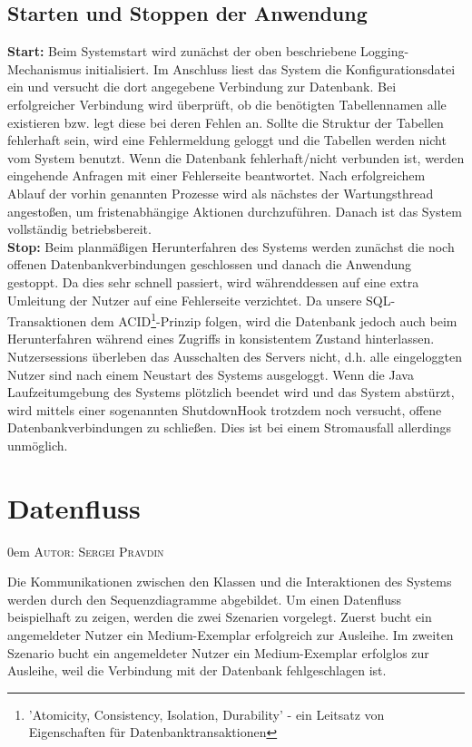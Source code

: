 \documentclass{article}
\makeatletter
\newcommand{\sectionauthor}[1]{
	{\parindent 0em \large \scshape Autor: #1 \par \nobreak \vspace*{1em}}
	\@afterheading
}
\makeatother
\begin{document}
\subsection{Starten und Stoppen der Anwendung}
\noindent \textbf{Start:} Beim Systemstart wird zunächst der oben beschriebene Logging-Mechanismus initialisiert. Im Anschluss liest das System die Konfigurationsdatei ein und versucht die dort angegebene Verbindung zur Datenbank. Bei erfolgreicher Verbindung wird überprüft, ob die benötigten Tabellennamen alle existieren bzw. legt diese bei deren Fehlen an. Sollte die Struktur der Tabellen fehlerhaft sein, wird eine Fehlermeldung geloggt und die Tabellen werden nicht vom System benutzt. Wenn die Datenbank fehlerhaft/nicht verbunden ist, werden eingehende Anfragen mit einer Fehlerseite beantwortet. Nach erfolgreichem Ablauf der vorhin genannten Prozesse wird als nächstes der Wartungsthread angestoßen, um fristenabhängige Aktionen durchzuführen. Danach ist das System vollständig betriebsbereit.\\
\textbf{Stop:} 
Beim planmäßigen Herunterfahren des Systems werden zunächst die noch offenen Datenbankverbindungen geschlossen und danach die Anwendung gestoppt. Da dies sehr schnell passiert, wird währenddessen auf eine extra Umleitung der Nutzer auf eine Fehlerseite verzichtet. Da unsere SQL-Transaktionen dem ACID\footnote{'Atomicity, Consistency, Isolation, Durability' - ein Leitsatz von Eigenschaften für Datenbanktransaktionen}-Prinzip folgen, wird die Datenbank jedoch auch beim Herunterfahren während eines Zugriffs in konsistentem Zustand hinterlassen. Nutzersessions überleben das Ausschalten des Servers nicht, d.h. alle eingeloggten Nutzer sind nach einem Neustart des Systems ausgeloggt. Wenn die Java Laufzeitumgebung des Systems plötzlich beendet wird und das System abstürzt, wird mittels einer sogenannten ShutdownHook trotzdem noch versucht, offene Datenbankverbindungen zu schließen. Dies ist bei einem Stromausfall allerdings unmöglich. 
\section{Datenfluss}
\sectionauthor{Sergei Pravdin}
Die Kommunikationen zwischen den Klassen und die Interaktionen des Systems werden durch den Sequenzdiagramme abgebildet. Um einen Datenfluss beispielhaft zu zeigen, werden die zwei Szenarien vorgelegt. Zuerst bucht ein angemeldeter Nutzer ein Medium-Exemplar erfolgreich zur Ausleihe. Im zweiten Szenario bucht ein angemeldeter Nutzer ein Medium-Exemplar erfolglos zur Ausleihe, weil die Verbindung mit der Datenbank fehlgeschlagen ist.
\end{document}
